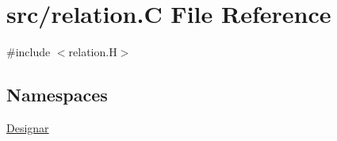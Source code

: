 \hypertarget{relation_8_c}{}\section{src/relation.C File Reference}
\label{relation_8_c}
{\ttfamily \#include $<$relation.\+H$>$}\newline
\subsection*{Namespaces}
\begin{DoxyCompactItemize}
\item 
 \hyperlink{namespace_designar}{Designar}
\end{DoxyCompactItemize}
